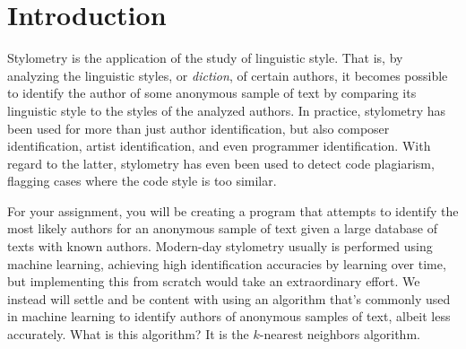 \section{Introduction}

Stylometry is the application of the study of linguistic style. That is, by
analyzing the linguistic styles, or \emph{diction}, of certain authors, it
becomes possible to identify the author of some anonymous sample of text by
comparing its linguistic style to the styles of the analyzed authors. In
practice, stylometry has been used for more than just author identification, but
also composer identification, artist identification, and even programmer
identification. With regard to the latter, stylometry has even been used to
detect code plagiarism, flagging cases where the code style is too similar.

For your assignment, you will be creating a program that attempts to identify
the most likely authors for an anonymous sample of text given a large database
of texts with known authors. Modern-day stylometry usually is performed using
machine learning, achieving high identification accuracies by learning over
time, but implementing this from scratch would take an extraordinary effort. We
instead will settle and be content with using an algorithm that's commonly used
in machine learning to identify authors of anonymous samples of text, albeit
less accurately. What is this algorithm? It is the $k$-nearest neighbors
algorithm.
